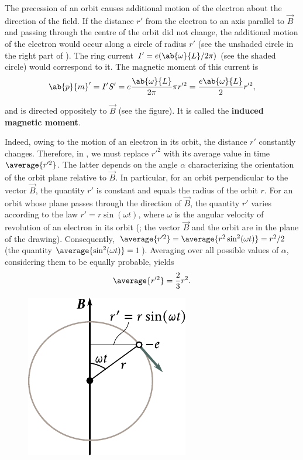 The precession of an orbit causes additional motion of the electron about the direction of the field.
If the distance $r'$ from the electron to an axis parallel to $\vec{B}$ and passing through the centre of the orbit did not change, the additional motion of the electron would occur along a circle of radius $r'$ (see the unshaded circle in the right part of ).
The ring current $I' = e (\ab{\omega}{L}/2\pi)$ (see the shaded circle) would correspond to it.
The magnetic moment of this current is
\begin{equation}\label{eq:7_47}
    \ab{p}{m}' = I' S' = e \frac{\ab{\omega}{L}}{2\pi} \pi r'^2 = \frac{e\ab{\omega}{L}}{2} r'^2,
\end{equation}

\noindent
and is directed oppositely to $\vec{B}$ (see the figure). It is called the \textbf{induced magnetic moment}.

Indeed, owing to the motion of an electron in its orbit, the distance $r'$ constantly changes.
Therefore, in , we must replace $r'^2$ with its average value in time $\average{r'^2}$.
The latter depends on the angle $\alpha$ characterizing the orientation of the orbit plane relative to $\vec{B}$.
In particular, for an orbit perpendicular to the vector $\vec{B}$, the quantity $r'$ is constant and equals the radius of the orbit $r$.
For an orbit whose plane passes through the direction of $\vec{B}$, the quantity $r'$ varies according to the law $r' = r\sin(\omega t)$, where $\omega$ is the angular velocity of revolution of an electron in its orbit (; the vector $\vec{B}$ and the orbit are in the plane of the drawing).
Consequently, $\average{r'^2}=\average{r^2\sin^2(\omega t)} = r^2/2$ (the quantity $\average{\sin^2(\omega t)}=1$).
Averaging over all possible values of $\alpha$, considering them to be equally probable, yields
\begin{equation}\label{eq:7_48}
    \average{r'^2} = \frac{2}{3} r^2.
\end{equation}

\begin{figure}[!htb]
	\begin{center}
		\includegraphics[scale=1]{figures/ch_07/fig_7_15.pdf}
		\caption[]{}
		\label{fig:7_15}
	\end{center}
	\vspace{-0.8cm}
\end{figure}

